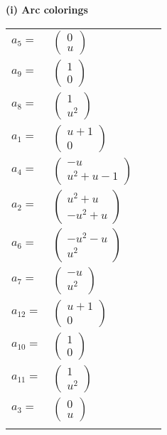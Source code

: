 \documentclass[1p]{elsarticle_modified}
\theoremstyle{definition}
\begin{document}
\flushleft \textbf{(i) Arc colorings}\\
\begin{tabular}{m{7pt} m{180pt} m{7pt} m{180pt} }
\flushright $a_{5}=$&$\begin{pmatrix}0\\u\end{pmatrix}$ \\
\flushright $a_{9}=$&$\begin{pmatrix}1\\0\end{pmatrix}$ \\
\flushright $a_{8}=$&$\begin{pmatrix}1\\u^2\end{pmatrix}$ \\
\flushright $a_{1}=$&$\begin{pmatrix}u+1\\0\end{pmatrix}$ \\
\flushright $a_{4}=$&$\begin{pmatrix}- u\\u^2+u-1\end{pmatrix}$ \\
\flushright $a_{2}=$&$\begin{pmatrix}u^2+u\\- u^2+u\end{pmatrix}$ \\
\flushright $a_{6}=$&$\begin{pmatrix}- u^2- u\\u^2\end{pmatrix}$ \\
\flushright $a_{7}=$&$\begin{pmatrix}- u\\u^2\end{pmatrix}$ \\
\flushright $a_{12}=$&$\begin{pmatrix}u+1\\0\end{pmatrix}$ \\
\flushright $a_{10}=$&$\begin{pmatrix}1\\0\end{pmatrix}$ \\
\flushright $a_{11}=$&$\begin{pmatrix}1\\u^2\end{pmatrix}$ \\
\flushright $a_{3}=$&$\begin{pmatrix}0\\u\end{pmatrix}$\\&\end{tabular}
\end{document}
